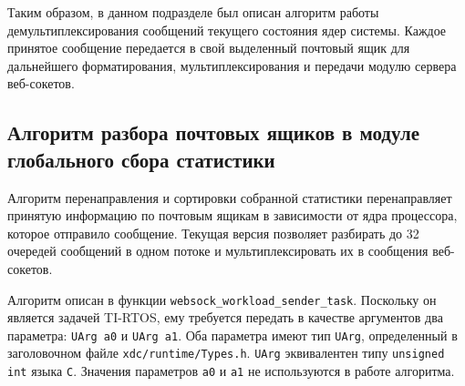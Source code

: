 Таким образом, в данном подразделе был описан алгоритм работы демультиплексирования
сообщений текущего состояния ядер системы. Каждое принятое сообщение передается
в свой выделенный почтовый ящик для дальнейшего форматирования, мультиплексирования
и передачи модулю сервера веб-сокетов.

\subsection{Алгоритм разбора почтовых ящиков в модуле глобального сбора статистики}

Алгоритм перенаправления и сортировки собранной статистики перенаправляет
принятую информацию по почтовым ящикам в зависимости от ядра процессора,
которое отправило сообщение. Текущая версия позволяет разбирать до 32
очередей сообщений в одном потоке и мультиплексировать их в сообщения веб-сокетов.

Алгоритм описан в функции \verb|websock_workload_sender_task|. Поскольку
он является задачей TI-RTOS, ему требуется передать в качестве аргументов
два параметра: \verb|UArg a0| и \verb|UArg a1|. Оба параметра имеют тип
\texttt{UArg}, определенный в заголовочном файле
\texttt{xdc/runtime/Types.h}. \verb|UArg| эквивалентен типу \texttt{unsigned int}
языка \texttt{C}. Значения параметров \verb|a0| и \verb|a1| не используются
в работе алгоритма.

